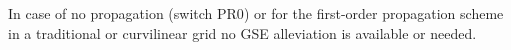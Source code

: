 
\vspace{\baselineskip}
\vspace{\baselineskip}


\noindent
In case of no propagation (switch {\code PR0}) or for the first-order
propagation scheme in a traditional or curvilinear grid no GSE alleviation is
available or needed.